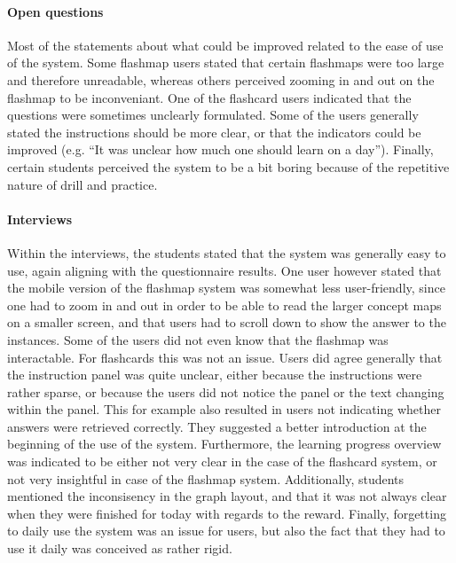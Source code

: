 \paragraph{Open questions} Most of the statements about what could be improved related to the ease of use of the system. Some flashmap users stated that certain flashmaps were too large and therefore unreadable, whereas others perceived zooming in and out on the flashmap to be inconveniant. One of the flashcard users indicated that the questions were sometimes unclearly formulated. Some of the users generally stated the instructions should be more clear, or that the indicators could be improved (e.g. ``It was unclear how much one should learn on a day''). Finally, certain students perceived the system to be a bit boring because of the repetitive nature of drill and practice.

\paragraph{Interviews} Within the interviews, the students stated that the system was generally easy to use, again aligning with the questionnaire results. One user however stated that the mobile version of the flashmap system was somewhat less user-friendly, since one had to zoom in and out in order to be able to read the larger concept maps on a smaller screen, and that users had to scroll down to show the answer to the instances. Some of the users did not even know that the flashmap was interactable. For flashcards this was not an issue. Users did agree generally that the instruction panel was quite unclear, either because the instructions were rather sparse, or because the users did not notice the panel or the text changing within the panel. This for example also resulted in users not indicating whether answers were retrieved correctly. They suggested a better introduction at the beginning of the use of the system. Furthermore, the learning progress overview was indicated to be either not very clear in the case of the flashcard system, or not very insightful in case of the flashmap system. Additionally, students mentioned the inconsisency in the graph layout, and that it was not always clear when they were finished for today with regards to the reward. Finally, forgetting to daily use the system was an issue for users, but also the fact that they had to use it daily was conceived as rather rigid.
